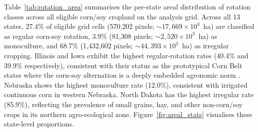 \documentclass{article}
\begin{document}
Table~\ref{tab:rotation_area} summarises the per-state areal distribution of
rotation classes across all eligible corn/soy cropland on the analysis grid.
Across all 13 states, 27.4\% of eligible grid cells (570{,}202 pixels;
${\sim}17{,}669 \times 10^3$~ha) are classified as regular corn-soy rotation,
3.9\% (81{,}308 pixels; ${\sim}2{,}520 \times 10^3$~ha) as monoculture,
and 68.7\% (1{,}432{,}602 pixels; ${\sim}44{,}393 \times 10^3$~ha) as
irregular cropping.
Illinois and Iowa exhibit the highest regular-rotation rates (40.4\% and
39.9\% respectively), consistent with their status as the prototypical Corn Belt
states where the corn-soy alternation is a deeply embedded agronomic norm
\citep{stern2012iowa}.
Nebraska shows the highest monoculture rate (12.0\%), consistent with irrigated
continuous corn in western Nebraska.
North Dakota has the highest irregular rate (85.9\%), reflecting the prevalence
of small grains, hay, and other non-corn/soy crops in its northern
agro-ecological zone.
Figure~\ref{fig:areal_stats} visualises these state-level proportions.
\end{document}
